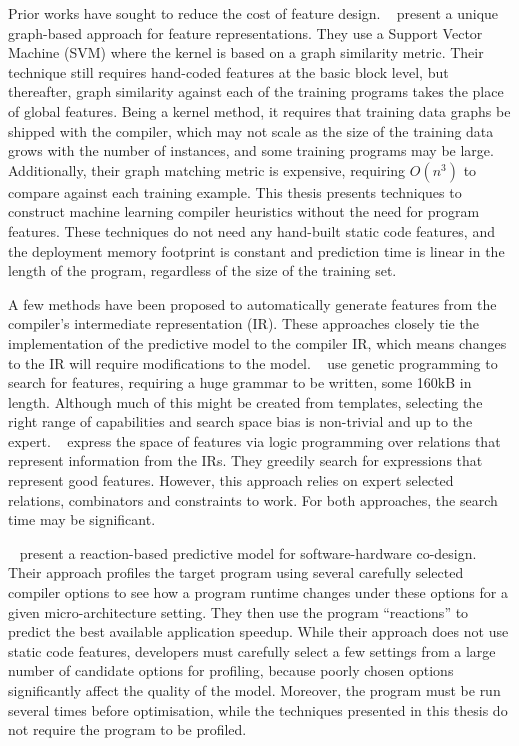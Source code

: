 Prior works have sought to reduce the cost of feature design. \citeauthor{Park2012}~\cite{Park2012} present a unique graph-based approach for feature representations. They use a Support Vector Machine (SVM) where the kernel is based on a graph similarity metric. Their technique still requires hand-coded features at the basic block level, but thereafter, graph similarity against each of the training programs takes the place of global features. Being a kernel method, it requires that training data graphs be shipped with the compiler, which may not scale as the size of the training data grows with the number of instances, and some training programs may be large. Additionally, their graph matching metric is expensive, requiring $O(n^3)$ to compare against each training example. This thesis presents techniques to construct machine learning compiler heuristics without the need for program features. These techniques do not need any hand-built static code features, and the deployment memory footprint is constant and prediction time is linear in the length of the program, regardless of the size of the training set.

\newpage
A few methods have been proposed to automatically generate features from the compiler's intermediate representation (IR). These approaches closely tie the implementation of the predictive model to the compiler IR, which means changes to the IR will require modifications to the model. \citeauthor{Leather2014}~\cite{Leather2014} use genetic programming to search for features, requiring a huge grammar to be written, some 160kB in length. Although much of this might be created from templates, selecting the right range of capabilities and search space bias is non-trivial and up to the expert. \citeauthor{Namolaru2010a}~\cite{Namolaru2010a} express the space of features via logic programming over relations that represent information from the IRs. They greedily search for expressions that represent good features. However, this approach relies on expert selected relations, combinators and constraints to work. For both approaches, the search time may be significant.

\citeauthor{Cavazos2006}~\cite{Cavazos2006} present a reaction-based predictive model for software-hardware co-design. Their approach profiles the target program using several carefully selected compiler options to see how a program runtime changes under these options for a given micro-architecture setting. They then use the program ``reactions'' to predict the best available application speedup. While their approach does not use static code features, developers must carefully select a few settings from a large number of candidate options for profiling, because poorly chosen options significantly affect the quality of the model. Moreover, the program must be run several times before optimisation, while the techniques presented in this thesis do not require the program to be profiled.

